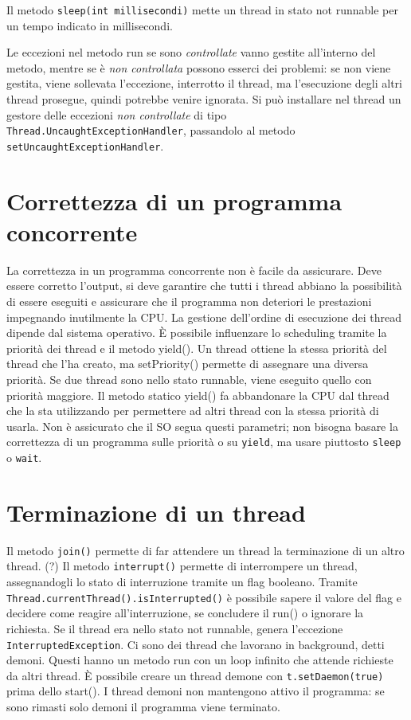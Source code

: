 Il metodo \texttt{sleep(int millisecondi)} mette un thread in stato not runnable per un tempo indicato in millisecondi.

Le eccezioni nel metodo run se sono \textit{controllate} vanno gestite all'interno del metodo, mentre se è \textit{non controllata} possono esserci dei problemi: se non viene gestita, viene sollevata l'eccezione, interrotto il thread, ma l'esecuzione degli altri thread prosegue, quindi potrebbe venire ignorata. Si può installare nel thread un gestore delle eccezioni \textit{non controllate} di tipo \texttt{Thread.UncaughtExceptionHandler}, passandolo al metodo \texttt{setUncaughtExceptionHandler}.

\section{Correttezza di un programma concorrente}
La correttezza in un programma concorrente non è facile da assicurare. Deve essere corretto l'output, si deve garantire che tutti i thread abbiano la possibilità di essere eseguiti e assicurare che il programma non deteriori le prestazioni impegnando inutilmente la CPU.
La gestione dell'ordine di esecuzione dei thread dipende dal sistema operativo. È possibile influenzare lo scheduling tramite la priorità dei thread e il metodo yield().
Un thread ottiene la stessa priorità del thread che l'ha creato, ma setPriority() permette di assegnare una diversa priorità. Se due thread sono nello stato runnable, viene eseguito quello con priorità maggiore.
Il metodo statico yield() fa abbandonare la CPU dal thread che la sta utilizzando per permettere ad altri thread con la stessa priorità di usarla.
Non è assicurato che il SO segua questi parametri; non bisogna basare la correttezza di un programma sulle priorità o su \texttt{yield}, ma usare piuttosto \texttt{sleep} o \texttt{wait}.

\section{Terminazione di un thread}
Il metodo \texttt{join()}  permette di far attendere un thread la terminazione di un altro thread. (?)
Il metodo \texttt{interrupt()} permette di interrompere un thread, assegnandogli lo stato di interruzione tramite un flag booleano. Tramite \texttt{Thread.currentThread().isInterrupted()} è possibile sapere il valore del flag e decidere come reagire all'interruzione, se concludere il run() o ignorare la richiesta. Se il thread era nello stato not runnable, genera l'eccezione \texttt{InterruptedException}.
Ci sono dei thread che lavorano in background, detti demoni. Questi hanno un metodo run con un loop infinito che attende richieste da altri thread. È possibile creare un thread demone con \texttt{t.setDaemon(true)} prima dello start(). I thread demoni non mantengono attivo il programma: se sono rimasti solo demoni il programma viene terminato.

